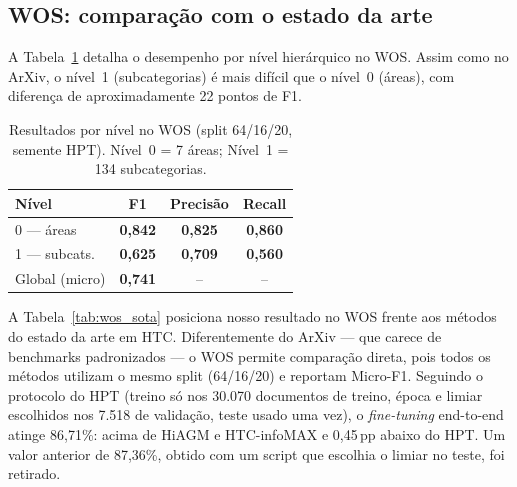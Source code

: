 \documentclass[11pt,a4paper,twoside]{article}
\newcommand{\ours}[1]{\textcolor{ourblue}{\textbf{#1}}}
\begin{document}
\subsection{WOS: comparação com o estado da arte}

A Tabela~\ref{tab:wos_levels} detalha o desempenho por nível hierárquico no WOS.
Assim como no ArXiv, o nível~1 (subcategorias) é mais difícil que o nível~0 (áreas),
com diferença de aproximadamente 22 pontos de F1.

\begin{table}[htbp]
\centering
\caption{Resultados por nível no WOS (split 64/16/20, semente HPT).
         Nível~0 = 7 áreas; Nível~1 = 134 subcategorias.}
\label{tab:wos_levels}
\begin{tabular}{lccc}
\toprule
\textbf{Nível} & \textbf{F1} & \textbf{Precisão} & \textbf{Recall} \\
\midrule
0 --- áreas      & \ours{0,842} & \ours{0,825} & \ours{0,860} \\
1 --- subcats.   & \ours{0,625} & \ours{0,709} & \ours{0,560} \\
\midrule
Global (micro)   & \ours{0,741} & --              & -- \\
\bottomrule
\end{tabular}
\end{table}

A Tabela~\ref{tab:wos_sota} posiciona nosso resultado no WOS frente aos métodos
do estado da arte em HTC. Diferentemente do ArXiv --- que carece de benchmarks
padronizados --- o WOS permite comparação direta, pois todos os métodos utilizam
o mesmo split (64/16/20) e reportam Micro-F1.  Seguindo o protocolo do HPT
(treino só nos 30.070 documentos de treino, época e limiar escolhidos nos 7.518
de validação, teste usado uma vez), o \textit{fine-tuning} end-to-end atinge
86,71\%: acima de HiAGM e HTC-infoMAX e 0,45\,pp abaixo do HPT.  Um valor
anterior de 87,36\%, obtido com um script que escolhia o limiar no teste, foi
retirado.
\end{document}
